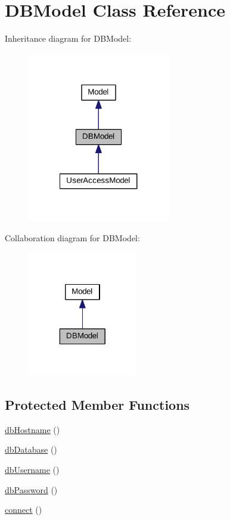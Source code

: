 \hypertarget{classDBModel}{\section{D\+B\+Model Class Reference}
\label{classDBModel}
}


Inheritance diagram for D\+B\+Model\+:\nopagebreak
\begin{figure}[H]
\begin{center}
\leavevmode
\includegraphics[width=176pt]{classDBModel__inherit__graph}
\end{center}
\end{figure}


Collaboration diagram for D\+B\+Model\+:\nopagebreak
\begin{figure}[H]
\begin{center}
\leavevmode
\includegraphics[width=136pt]{classDBModel__coll__graph}
\end{center}
\end{figure}
\subsection*{Protected Member Functions}
\begin{DoxyCompactItemize}
\item 
\hyperlink{classDBModel_af39102ef1235d8f2993208bc320ad0ce}{db\+Hostname} ()
\item 
\hyperlink{classDBModel_a8114bdda6fb2b260ce3c56710d0f9d1c}{db\+Database} ()
\item 
\hyperlink{classDBModel_a17aab9a5c0364118192c892e8dbd55f0}{db\+Username} ()
\item 
\hyperlink{classDBModel_a8596b488008a8b12a6dce706490fb68b}{db\+Password} ()
\item 
\hyperlink{classDBModel_ad54a4dc85f41f25cbf7675b712d5d5ff}{connect} ()
\end{DoxyCompactItemize}
